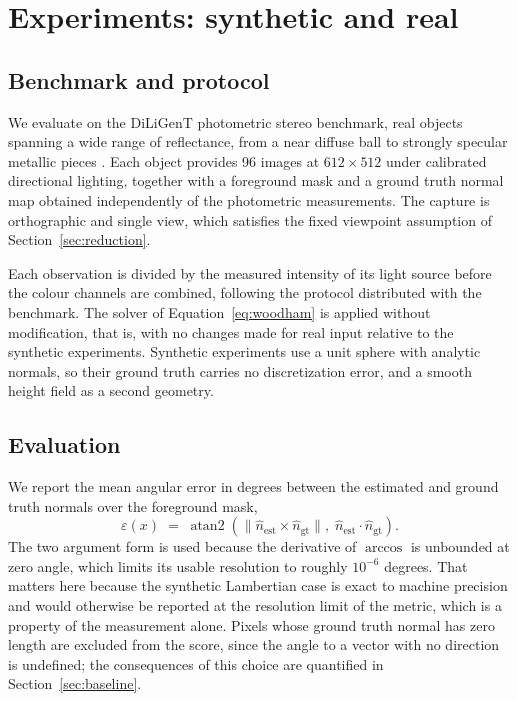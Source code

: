 \documentclass[10pt,twocolumn,letterpaper]{article}
\begin{document}
\section{Experiments: synthetic and real}

\subsection{Benchmark and protocol}

We evaluate on the DiLiGenT photometric stereo benchmark, \diligentObjects{}
real objects spanning a wide range of reflectance, from a near diffuse ball to
strongly specular metallic pieces \cite{shi2016}. Each object provides 96
images at $612\times512$ under calibrated directional lighting, together with a
foreground mask and a ground truth normal map obtained independently of the
photometric measurements. The capture is orthographic and single view, which
satisfies the fixed viewpoint assumption of Section~\ref{sec:reduction}.

Each observation is divided by the measured intensity of its light source before
the colour channels are combined, following the protocol distributed with the
benchmark. The solver of Equation~\eqref{eq:woodham} is applied without
modification, that is, with no changes made for real input relative to the
synthetic experiments. Synthetic experiments use a unit sphere with analytic
normals, so their ground truth carries no discretization error, and a smooth
height field as a second geometry.

\subsection{Evaluation}
\label{sec:metric}

We report the mean angular error in degrees between the estimated and ground
truth normals over the foreground mask,
%
\begin{equation}
  \varepsilon(x) \;=\;
  \operatorname{atan2}\!\left(
    \lVert \hat{n}_{\text{est}} \times \hat{n}_{\text{gt}} \rVert,\;
    \hat{n}_{\text{est}} \cdot \hat{n}_{\text{gt}}
  \right).
  \label{eq:angular-error}
\end{equation}
%
The two argument form is used because the derivative of $\arccos$ is unbounded
at zero angle, which limits its usable resolution to roughly $10^{-6}$ degrees.
That matters here because the synthetic Lambertian case is exact to machine
precision and would otherwise be reported at the resolution limit of the
metric, which is a property of the measurement alone. Pixels whose ground truth
normal has zero length are excluded from the score, since the angle to a vector
with no direction is undefined; the consequences of this choice are quantified
in Section~\ref{sec:baseline}.
\end{document}
